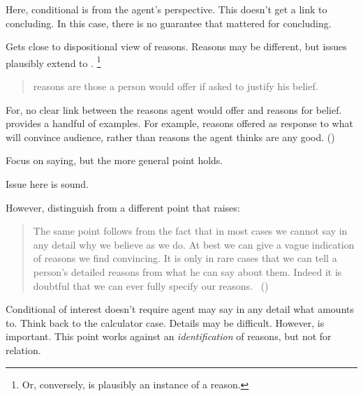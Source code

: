 \begin{note}
  Here, conditional is from the agent's perspective.
  This doesn't get a link to concluding.
  In this case, there is no guarantee that \support{} mattered for concluding.

  Gets close to dispositional view of reasons.
  Reasons may be different, but issues plausibly extend to \support{}.%
  \footnote{
    Or, conversely, \support{} is plausibly an instance of a reason.
  }

  \begin{quote}
    reasons are those a person would offer if asked to justify his belief.
  \end{quote}

  For, no clear link between the reasons agent would offer and reasons for belief.
  \textcite{Harman:1973ww} provides a handful of examples.
  For example, reasons offered as response to what will convince audience, rather than reasons the agent thinks are any good.
  (\citeyear[26--27]{Harman:1973ww})

  Focus on saying, but the more general point holds.

  Issue here is sound.

  However, distinguish from a different point that \citeauthor{Harman:1973ww} raises:

  \begin{quote}
    The same point follows from the fact that in most cases we cannot say in any detail why we believe as we do.
    At best we can give a vague indication of reasons we find convincing.
    It is only in rare cases that we can tell a person’s detailed reasons from what he can say about them.
    Indeed it is doubtful that we can ever fully specify our reasons.%
    \mbox{ }\hfill\mbox{(\citeyear[28]{Harman:1973ww})}
  \end{quote}

  Conditional of interest doesn't require agent may say in any detail what \support{} amounts to.
  Think back to the calculator case.
  Details may be difficult.
  However, \support{} is important.
  This point works against an \emph{identification} of reasons, but not for relation.
\end{note}


